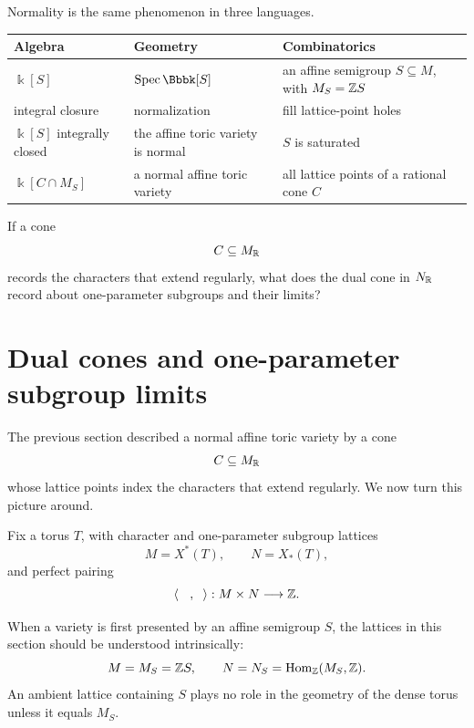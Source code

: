\begin{threedictionaries}
Normality is the same phenomenon in three languages.

\medskip

\begin{center}
\small
\begin{tabularx}{\linewidth}{@{}
  >{\raggedright\arraybackslash}X
  >{\raggedright\arraybackslash}X
  >{\raggedright\arraybackslash}X@{}}
\toprule
\textbf{Algebra}
&
\textbf{Geometry}
&
\textbf{Combinatorics}
\\
\midrule
\(\Bbbk[S]\)
&
\(\Spec\Bbbk[S]\)
&
an affine semigroup \(S\subseteq M\), with \(M_S=\mathbb{Z} S\)
\\[1mm]
integral closure
&
normalization
&
fill lattice-point holes
\\[1mm]
\(\Bbbk[S]\) integrally closed
&
the affine toric variety is normal
&
\(S\) is saturated
\\[1mm]
\(\Bbbk[C\cap M_S]\)
&
a normal affine toric variety
&
all lattice points of a rational cone \(C\)
\\
\bottomrule
\end{tabularx}
\end{center}
\end{threedictionaries}

\begin{guidingquestion}
If a cone
\[
C\subseteq M_{\mathbb{R}}
\]
records the characters that extend regularly, what does the dual cone
in \(N_{\mathbb{R}}\) record about one-parameter subgroups and their limits?
\end{guidingquestion}


\section{Dual cones and one-parameter subgroup limits}
\label{sec:dual-cones-oneps-limits}

The previous section described a normal affine toric variety by a cone
\[
C\subseteq M_{\mathbb{R}}
\]
whose lattice points index the characters that extend regularly. We
now turn this picture around.

Fix a torus \(T\), with character and one-parameter subgroup lattices
\[
M=X^*(T),
\qquad
N=X_*(T),
\]
and perfect pairing
\[
\left\langle \phantom{m},\phantom{u}\right\rangle:
M\times N\longrightarrow\mathbb{Z}.
\]

When a variety is first presented by an affine semigroup \(S\), the
lattices in this section should be understood intrinsically:
\[
M=M_S=\mathbb{Z} S,
\qquad
N=N_S=\operatorname{Hom}_{\mathbb{Z}}(M_S,\mathbb{Z}).
\]
An ambient lattice containing \(S\) plays no role in the geometry of
the dense torus unless it equals \(M_S\).

